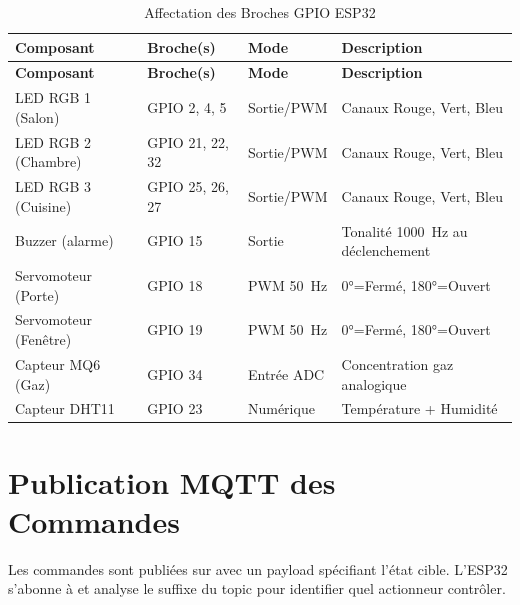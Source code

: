 \begin{center}
\begin{longtable}{p{} p{} p{} p{}}
\caption{Affectation des Broches GPIO ESP32}\label{tab:esp32_pins}\\
\toprule
\textbf{Composant} & \textbf{Broche(s)} & \textbf{Mode} & \textbf{Description} \\
\midrule
\endfirsthead
\toprule
\textbf{Composant} & \textbf{Broche(s)} & \textbf{Mode} & \textbf{Description} \\
\midrule
\endhead
\bottomrule
\endfoot
LED RGB 1 (Salon)    & GPIO 2, 4, 5    & Sortie/PWM & Canaux Rouge, Vert, Bleu \\
LED RGB 2 (Chambre)  & GPIO 21, 22, 32 & Sortie/PWM & Canaux Rouge, Vert, Bleu \\
LED RGB 3 (Cuisine)  & GPIO 25, 26, 27 & Sortie/PWM & Canaux Rouge, Vert, Bleu \\
Buzzer (alarme)      & GPIO 15         & Sortie     & Tonalité 1000~Hz au déclenchement \\
Servomoteur (Porte)  & GPIO 18         & PWM 50~Hz  & 0°=Fermé, 180°=Ouvert \\
Servomoteur (Fenêtre)& GPIO 19         & PWM 50~Hz  & 0°=Fermé, 180°=Ouvert \\
Capteur MQ6 (Gaz)   & GPIO 34         & Entrée ADC & Concentration gaz analogique \\
Capteur DHT11        & GPIO 23         & Numérique  & Température + Humidité \\
\end{longtable}
\end{center}

\section{Publication MQTT des Commandes}

Les commandes sont publiées sur  avec un payload spécifiant
l'état cible. L'ESP32 s'abonne à  et analyse le suffixe du topic pour
identifier quel actionneur contrôler.

